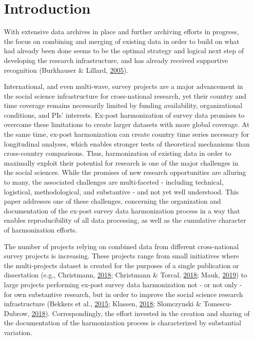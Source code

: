 \documentclass[12pt,]{article}
\begin{document}
\hypertarget{introduction}{%
\section{Introduction}\label{introduction}}

With extensive data archives in place and further archiving efforts in progress, the focus on combining and merging of existing data in order to build on what had already been done seems to be the optimal strategy and logical next step of developing the research infrastructure, and has already received supportive recognition (Burkhauser \& Lillard, \protect\hyperlink{ref-Burkhauser2005}{2005}).

International, and even multi-wave, survey projects are a major advancement in the social science infrastructure for cross-national research, yet their country and time coverage remains necessarily limited by funding availability, organizational conditions, and PIs' interests. Ex-post harmonization of survey data promises to overcome these limitations to create larger datasets with more global coverage. At the same time, ex-post harmonization can create country time series necessary for longitudinal analyses, which enables stronger tests of theoretical mechanisms than cross-country comparisons. Thus, harmonization of existing data in order to maximally exploit their potential for research is one of the major challenges in the social sciences. While the promises of new research opportunities are alluring to many, the associated challenges are multi-faceted - including technical, logistical, methodological, and substantive - and not yet well understood. This paper addresses one of these challenges, concerning the organization and documentation of the ex-post survey data harmonization process in a way that enables reproducibility of all data processing, as well as the cumulative character of harmonization efforts.

The number of projects relying on combined data from different cross-national survey projects is increasing. These projects range from small initiatives where the multi-projects dataset is created for the purposes of a single publication or dissertation (e.g., Christmann, \protect\hyperlink{ref-Christmann2018}{2018}; Christmann \& Torcal, \protect\hyperlink{ref-Christmann2018a}{2018}; Mauk, \protect\hyperlink{ref-Mauk2019}{2019}) to large projects performing ex-post survey data harmonization not - or not only - for own substantive research, but in order to improve the social science research infrastructure (Bekkers et al., \protect\hyperlink{ref-Bekkers2015}{2015}; Klassen, \protect\hyperlink{ref-Klassen2018}{2018}; Slomczynski \& Tomescu-Dubrow, \protect\hyperlink{ref-Slomczynski2018}{2018}). Correspondingly, the effort invested in the creation and sharing of the documentation of the harmonization process is characterized by substantial variation.
\end{document}
